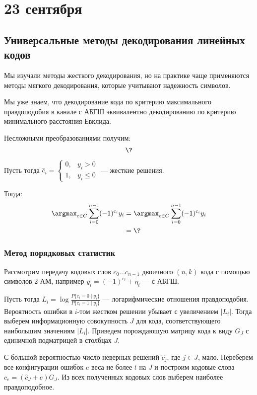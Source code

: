 \chapter{23 сентября}

\section{Универсальные методы декодирования линейных кодов}

Мы изучали методы жесткого декодирования, но на практике чаще применяются методы мягкого декодирования, которые учитывают надежность символов.

Мы уже знаем, что декодирование кода по критерию максимального правдоподобия
в канале с АБГШ эквивалентно декодированию по критерию минимального расстояния Евклида.

Несложными преобразованиями получим:
\[\?\]

Пусть тогда \(\hat{c}_i = \begin{cases}
    0, & y_i > 0 \\
    1, & y_i \leq 0
\end{cases}\) --- жесткие решения.

Тогда:
\begin{align}
    \argmax_{c \in C} \sum_{i=0}^{n - 1} ( -1)^{c_i} y_i
    & = \argmax_{c \in C} \sum_{i=0}^{n - 1} ( -1)^{c_i} y_i \\
    & = \? \\
\end{align}

\unfinished

\subsection{Метод порядковых статистик}

Рассмотрим передачу кодовых слов \(c_0 \dots c_{n-1}\) двоичного \((n, k)\) кода
с помощью символов 2-АМ, например \(y_i = ( - 1)^{c_i} + \eta_i\) --- с АБГШ.

Пусть тогда \(L_i = \log \frac{P \{c_i = 0 \mid y_i\}}{P \{c_i = 1 \mid y_i\}}\) --- логарифмические отношения правдоподобия.
Вероятность ошибки в \(i\)-том жестком решении убывает с увеличением \(|L_i|\).
Тогда выберем информационную совокупность \(J\) для кода, соответствующего
наибольшим значениям \(|L_i|\). Приведем порождающую матрицу кода к виду \(G_J\) с единичной подматрицей в столбцах \(J\).

С большой вероятностью число неверных решений \(\hat{c}_j\), где \(j \in J\), мало.
Переберем все конфигурации ошибок \(e\) веса не более \(t\) на \(J\) и построим кодовые слова \(c_e = (\hat{c}_J + e)G_J\).
Из всех полученных кодовых слов выберем наиболее правдоподобное.

